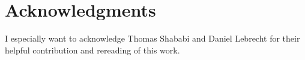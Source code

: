 \chapter*{Acknowledgments}

I especially want to acknowledge Thomas Shababi and Daniel Lebrecht for their
helpful contribution and rereading of this work.
